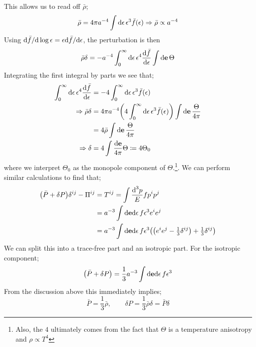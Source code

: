 This allows us to read off $\bar{\rho}$;
\begin{equation}
\bar{\rho} = 4\pi a^{-4}\int{\text{d}\epsilon \,\epsilon^3\bar{f}(\epsilon)} \Rightarrow \bar{\rho} \propto a^{-4}
\end{equation}
Using $\text{d} \bar{f}/ \text{d} \log \epsilon = \epsilon \text{d} \bar{f}/ \text{d} \epsilon$, the perturbation is then
\begin{equation*}
\bar{\rho}\delta = -a^{-4}\int_0^{\infty}{\text{d}\epsilon \,\epsilon^4 \frac{\text{d} \bar{f}}{\text{d} \epsilon}\int{\text{d}\mathbf e \,\Theta}}
\end{equation*}
Integrating the first integral by parts we see that;
\begin{align*}
\int_0^{\infty}{\upd{\epsilon}\epsilon^4 \frac{\ud \bar{f}}{\ud \epsilon}} &= -4\int_0^{\infty}{\upd{\epsilon}\epsilon^3 \bar{f}(\epsilon)} \\
\Rightarrow \bar{\rho}\delta &= 4\pi a^{-4}\left(4\int_0^{\infty}{\upd{\epsilon}\epsilon^3 \bar{f}(\epsilon)}\right)\int{\upd{\vec e}\frac{\Theta}{4\pi}} \\
&= 4\bar{\rho}\int{\upd{\vec e}\frac{\Theta}{4\pi}} \\
\Rightarrow \delta &= 4\int{\frac{\ud \vec e}{4\pi}\Theta} \coloneqq 4 \Theta_0
\end{align*}
where we interpret $\Theta_0$ as the monopole component of $\Theta$.\footnote{Also, the $4$ ultimately comes from the fact that $\Theta$ is a temperature anisotropy and $\rho \propto T^{4}$}. We can perform similar calculations to find that;
\begin{align*}
\left(\bar{P} + \delta P\right)\delta^{ij} - \Pi^{ij} &= T^{ij} = \int{\frac{\ud^3 p}{E}fp^{i}p^{j}} \\
&= a^{-3}\int{\ud \vec e \upd{\epsilon}f\epsilon^3 e^{i}e^{j}} \\
&= a^{-3}\int{\ud \vec{e}\upd{\epsilon}f\epsilon^3\left(\left(e^{i}e^{j} - \tfrac{1}{3}\delta^{ij}\right) + \tfrac{1}{3}\delta^{ij}\right)}
\end{align*}
We can split this into a trace-free part and an isotropic part. For the isotropic component;
\begin{equation*}
\left(\bar{P} + \delta P\right) = \frac{1}{3}a^{-3}\int{\ud\vec e\upd{\epsilon}f\epsilon^3}
\end{equation*}
From the discussion above this immediately implies;
\begin{equation}
\bar{P} = \frac{1}{3}\bar{\rho}, \qquad \delta P = \frac{1}{3}\bar{\rho}\delta = \bar{P}\delta
\end{equation}
